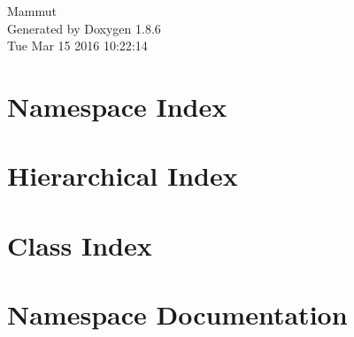 \documentclass[twoside]{book}
\newcommand{\clearemptydoublepage}{%
  \newpage{\pagestyle{empty}\cleardoublepage}%
}
\begin{document}
\hypersetup{pageanchor=false}
\begin{titlepage}
\vspace*{7cm}
\begin{center}%
{\Large Mammut }\\
\vspace*{1cm}
{\large Generated by Doxygen 1.8.6}\\
\vspace*{0.5cm}
{\small Tue Mar 15 2016 10:22:14}\\
\end{center}
\end{titlepage}
\clearemptydoublepage
\tableofcontents
\clearemptydoublepage
{}
\hypersetup{pageanchor=true}

\chapter{Namespace Index}

\chapter{Hierarchical Index}

\chapter{Class Index}

\chapter{Namespace Documentation}

\end{document}
